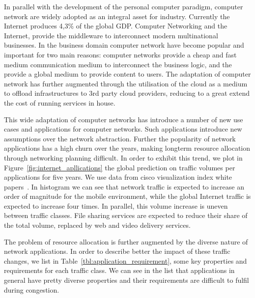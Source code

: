 In parallel with the development of the personal computer paradigm, computer
network are widely adopted as an integral asset for industry.
Currently the Internet produces 4,3\% of the global GDP. Computer Networking
and the Internet, provide the middleware to interconnect modern multinational
businesses. In the business domain computer network have become popular and
important for two main reasons: computer networks provide a cheap and fast
medium communication medium to interconnect the business logic, and the provide
a global medium to provide content to users. The adaptation of computer network
has further augmented through the utilisation of the cloud as a medium to
offload infrastructures to 3rd party cloud providers, reducing to a great extend
the cost of running services in house. 

This wide adaptation of computer networks has introduce a number of new use cases and
applications for computer networks. Such applications introduce new assumptions over the
network abstraction. Further the popularity of network applications has a high churn over
the years, making longterm resource allocation through networking planning difficult.  In order to exhibit this trend,
we plot in Figure~\ref{fig:internet_apllications} the global prediction on traffic volumes
per applications for five years. We use data from cisco visualization index white
papers~\cite{Mobile:2012vd,Cisco:2012wu}. In histogram we can see that network traffic is
expected to increase an order of magnitude for the mobile environment, while the global
Internet traffic is expected to increase four times. In parallel, this volume increase is
uneven between traffic classes. File sharing services are expected to reduce their share
of the total volume, replaced by web and video delivery services. 

The problem of resource allocation is further augmented by the diverse nature of network
applications. In order to describe better the impact of these traffic changes, we list in
Table~\ref{tbl:application_requirement}, some key properties and requirements for each
traffic class. We can see in the list that applications in general have pretty diverse
properties and their requirements are difficult to fulfil during congestion. 

